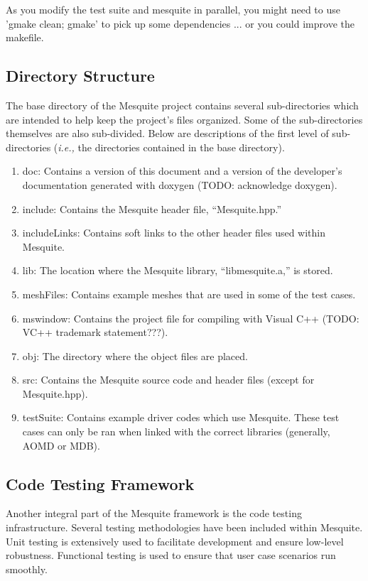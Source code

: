 \documentclass[letter]{report}
\begin{document}
As you modify the test suite and mesquite in parallel, you might 
need to use 'gmake clean; gmake' to pick up some dependencies ... 
or you could improve the makefile. 


\subsection{Directory Structure}

The base directory of the Mesquite project contains several
sub-directories which are intended to help keep the project's
files organized.  Some of the sub-directories themselves are
also sub-divided.  Below are descriptions of the first level
of sub-directories ({\it i.e.,} the directories contained in the
base directory).
\begin{enumerate}
\item doc:  Contains a version of this document and a version of
the developer's documentation generated with doxygen (TODO: acknowledge
doxygen).
\item include:  Contains the Mesquite header file, ``Mesquite.hpp.''
\item includeLinks:  Contains soft links to the other header files
used within Mesquite.  
\item lib:  The location where the Mesquite library, ``libmesquite.a,'' is
stored.
\item meshFiles:  Contains example meshes that are used in some of
the test cases.
\item mswindow:  Contains the project file for compiling with Visual C++
(TODO: VC++ trademark statement???).
\item obj:  The directory where the object files are placed.
\item src:  Contains the Mesquite source code and header files (except for
Mesquite.hpp).
\item testSuite:  Contains example driver codes which use Mesquite.  These
test cases can only be ran when linked with the correct libraries (generally,
AOMD or MDB).
\end{enumerate}

\subsection{Code Testing Framework}

Another integral part of the Mesquite framework is the code testing
infrastructure.  Several testing methodologies have been included
within Mesquite. Unit testing is extensively used to facilitate
development and ensure low-level robustness. Functional testing is
used to ensure that user case scenarios run smoothly.
\end{document}
